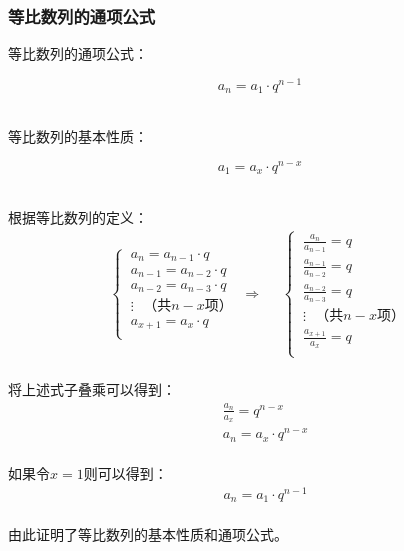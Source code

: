 \documentclass[UTF8]{ctexart}
\begin{document}
\subsubsection{等比数列的通项公式}
    \setcounter{equation}{0}
    等比数列的通项公式：
    \begin{large}
        \begin{equation*}
            a_n=a_1\cdot q^{n-1}
        \end{equation*}
    \end{large}\\
    等比数列的基本性质：
    \begin{large}
        \begin{equation*}
            a_1=a_x\cdot q^{n-x}
        \end{equation*}
    \end{large}\\
    根据等比数列的定义：
    \begin{align}
        \begin{cases}
            ~a_{n}=a_{n-1}\cdot q\\[3mm]
            ~a_{n-1}=a_{n-2}\cdot q\\[3mm]
            ~a_{n-2}=a_{n-3}\cdot q\\[3mm]
            ~\vdots~~~\text{（共$n-x$项）}\\[3mm]
            ~a_{x+1}=a_{x}\cdot q\\[1mm]
        \end{cases}~\Longrightarrow~~~~~~
        \begin{cases}
            ~\frac{a_{n}}{a_{n-1}}=q\\[3mm]
            ~\frac{a_{n-1}}{a_{n-2}}=q\\[3mm]
            ~\frac{a_{n-2}}{a_{n-3}}=q\\[3mm]
            ~\vdots~~~\text{（共$n-x$项）}\\[3mm]
            ~\frac{a_{x+1}}{a_{x}}=q\\[1mm]
        \end{cases}
    \end{align}\\
    将上述式子叠乘可以得到：
    \begin{align}
        &\frac{a_n}{a_x}=q^{n-x}\\[3mm]
        &a_n=a_x\cdot q^{n-x}
    \end{align}\\
    如果令$x=1$则可以得到：
    \begin{align}
        &a_n=a_1\cdot q^{n-1}
    \end{align}\\
    由此证明了等比数列的基本性质和通项公式。
\end{document}
